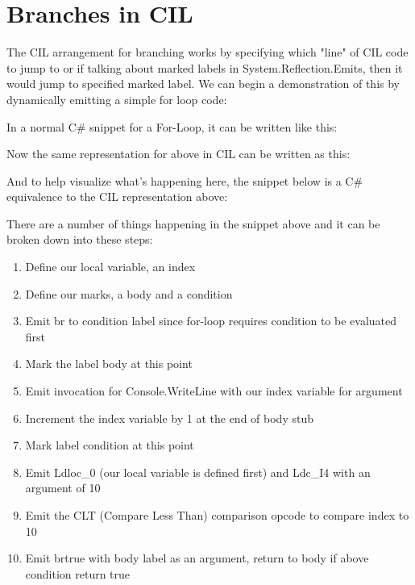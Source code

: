 \newpage

\section{Branches in CIL}

The CIL arrangement for branching works by specifying which "line" of CIL code to jump to or if talking about marked labels in System.Reflection.Emits, then it would jump to specified marked label. We can begin a demonstration of this by dynamically emitting a simple for loop code:

In a normal C\# snippet for a For-Loop, it can be written like this:



Now the same representation for above in CIL can be written as this:



And to help visualize what's happening here, the snippet below is a C\# equivalence to the CIL representation above:



\newpage

There are a number of things happening in the snippet above and it can be broken down into these steps:

\begin{enumerate}
\item Define our local variable, an index
\item Define our marks, a body and a condition
\item Emit br to condition label since for-loop requires condition to be evaluated first
\item Mark the label body at this point
\item Emit invocation for Console.WriteLine with our index variable for argument
\item Increment the index variable by 1 at the end of body stub
\item Mark label condition at this point
\item Emit Ldloc\_0 (our local variable is defined first) and Ldc\_I4 with an argument of 10
\item Emit the CLT (Compare Less Than) comparison opcode to compare index to 10
\item Emit brtrue with body label as an argument, return to body if above condition return true
\end{enumerate}

